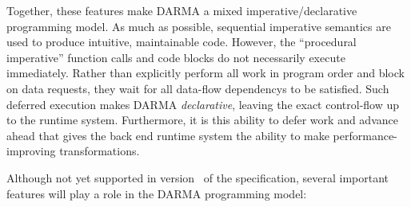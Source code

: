 Together, these features make \gls{DARMA} a mixed \gls{imperative}/\gls{declarative} \gls{programming model}.
As much as possible, sequential \gls{imperative} semantics are used to produce intuitive, maintainable code.
However, the ``\gls{procedural} \gls{imperative}'' function calls and code
blocks do not necessarily execute immediately.
Rather than explicitly perform all work in program order and block on data requests,
they wait for all \glspl{data-flow dependency} to be satisfied.
Such \gls{deferred execution} makes \gls{DARMA} \emph{declarative}, leaving the
exact control-flow up to the \gls{runtime system}.
Furthermore, it is this ability to defer work and advance ahead that gives the \gls{back end}
\gls{runtime  system} the ability to make performance-improving transformations.








Although not yet supported in version \specVersion\ of the specification, several
important features will play a role in the \gls{DARMA} \gls{programming model}:

